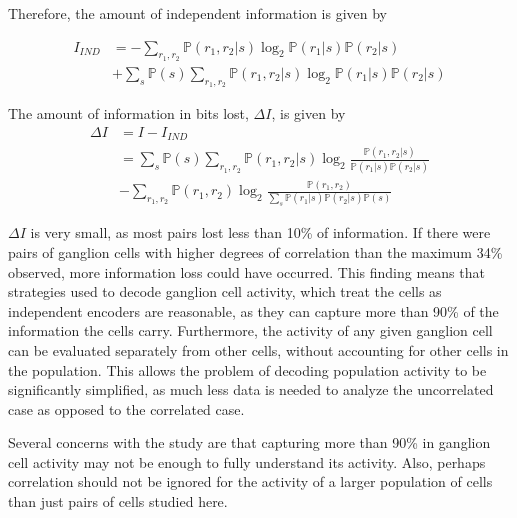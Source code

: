 \documentclass[twoside]{article}
\begin{document}
\begin{multicols}{2}
Therefore, the amount of independent information is given by

\begin{align}
	I_{IND} 
		&= -\sum_{r_1,r_2}\mathbb{P}(r_1,r_2|s)\log_2\mathbb{P}(r_1|s)\mathbb{P}(r_2|s) \\
		&+ \sum_s\mathbb{P}(s) \sum_{r_1,r_2}\mathbb{P}(r_1,r_2|s)\log_2\mathbb{P}(r_1|s)\mathbb{P}(r_2|s) 
\end{align}

The amount of information in bits lost, $\Delta I$, is given by 
\begin{align}
	\Delta I 
		&= I - I_{IND} \\
		&= \sum_s\mathbb{P}(s) \sum_{r_1,r_2}\mathbb{P}(r_1,r_2|s) \log_2 \frac{\mathbb{P}(r_1,r_2|s)}{\mathbb{P}(r_1|s)\mathbb{P}(r_2|s)} \\
		&- \sum_{r_1,r_2}\mathbb{P}(r_1,r_2) \log_2 \frac{\mathbb{P}(r_1,r_2)}{\sum_s \mathbb{P}(r_1|s)\mathbb{P}(r_2|s) \mathbb{P}(s)} 
\end{align}

$\Delta I$ is very small, as most pairs lost less than 10\% of information. If there were pairs of ganglion cells with higher degrees of correlation than the maximum 34\% observed, more information loss could have occurred. This finding means that strategies used to decode ganglion cell activity, which treat the cells as independent encoders are reasonable, as they can capture more than 90\% of the information the cells carry. Furthermore, the activity of any given ganglion cell can be evaluated separately from other cells, without accounting for other cells in the population. This allows the problem of decoding population activity to be significantly simplified, as much less data is needed to analyze the uncorrelated case as opposed to the correlated case. 

Several concerns with the study are that capturing more than 90\% in ganglion cell activity may not be enough to fully understand its activity. Also, perhaps correlation should not be ignored for the activity of a larger population of cells than just pairs of cells studied here. 









\end{multicols}
\end{document}
